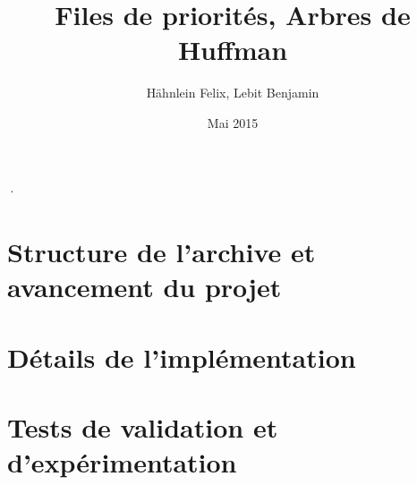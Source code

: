 \documentclass[a4paper,11pt]{article}
\title{Files de priorités, Arbres de Huffman}
\author{Hähnlein Felix, Lebit Benjamin}
\date{Mai 2015}
\begin{document}
·\maketitle

\section{Structure de l'archive et avancement du projet}

\section{Détails de l'implémentation}

\section{Tests de validation et d'expérimentation} 
\end{document}
